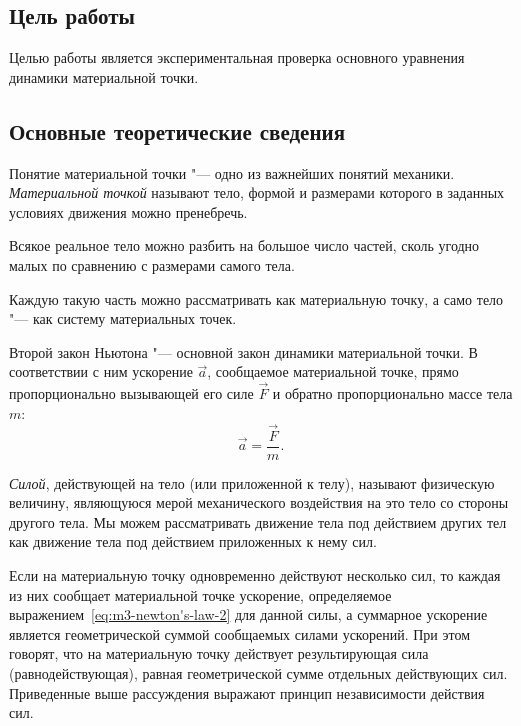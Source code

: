 \documentclass[a4paper, 12pt]{extarticle}
\begin{document}
\MTDTitlePage
\MTDInfoPage

\setcounter{section}{3}

\subsection{Цель работы}
Целью работы является экспериментальная проверка основного уравнения динамики материальной точки. 

\subsection{Основные теоретические сведения}
Понятие материальной точки "--- одно из важнейших понятий механики. \emph{Материальной точкой} называют тело, формой и размерами которого в заданных условиях движения можно пренебречь.

Всякое реальное тело можно разбить на большое число частей, сколь угодно малых по сравнению с размерами самого тела.

Каждую такую часть можно рассматривать как материальную точку, а само тело "--- как систему материальных точек. 

Второй закон Ньютона "--- основной закон динамики материальной точки. В соответствии с ним ускорение $\vec{a}$, сообщаемое материальной точке, прямо пропорционально вызывающей его силе $\vec{F}$ и обратно пропорционально массе тела $m$: 
\begin{equation}
\label{eq:m3-newton's-law-2}
\vec{a} = \frac{\vec{F}}{m}.
\end{equation}

\emph{Силой}, действующей на тело (или приложенной к телу), называют физическую величину, являющуюся мерой механического воздействия на это тело со стороны другого тела. Мы можем рассматривать движение тела под действием других тел как движение тела под действием приложенных к нему сил. 

Если на материальную точку одновременно действуют несколько сил, то каждая из них сообщает материальной точке ускорение, определяемое выражением~\eqref{eq:m3-newton's-law-2} для данной силы, а суммарное ускорение является геометрической суммой сообщаемых силами ускорений. При этом говорят, что на материальную точку действует результирующая сила (равнодействующая), равная геометрической сумме отдельных действующих сил. Приведенные выше рассуждения выражают принцип независимости действия сил. 
\end{document}
